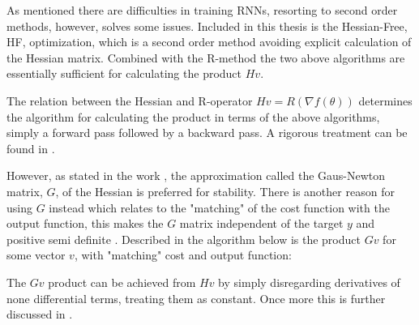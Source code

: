 As mentioned there are difficulties in training RNNs, resorting to second order methods, however, solves some issues. Included in this thesis is the Hessian-Free, HF, optimization, which is a second order method avoiding explicit calculation of the Hessian matrix. Combined with the R-method the two above algorithms are essentially sufficient for calculating the product $Hv$. 

The relation between the Hessian and R-operator $Hv = R(\nabla f(\theta))$ determines the algorithm for calculating the product in terms of the above algorithms, simply a forward pass followed by a backward pass. A rigorous treatment can be found in \cite{suts}.

However, as stated in the work \cite{suts}, the approximation called the Gaus-Newton matrix, \(G\), of the Hessian is preferred for stability. There is another reason for using $G$ instead which relates to the "matching" of the cost function with the output function, this makes the $G$ matrix independent of the target $y$ and positive semi definite \cite{Martens2012}. Described in the algorithm below is the product \(Gv\) for some vector $v$, with "matching" cost and output function:

\begin{algorithmic}[1]
    \EndFor
    \EndFor
    \State {}
\end{algorithmic}

The $Gv$ product can be achieved from $Hv$ by simply disregarding derivatives of none differential terms, treating them as constant. Once more this is further discussed in \cite{suts}.

